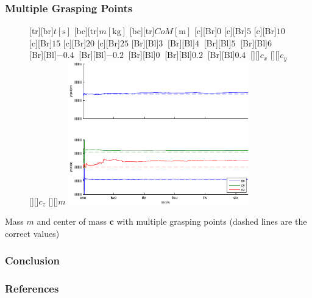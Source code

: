 \documentclass[student,noshadow]{ITRslides}
\renewcommand{\vec}[1]{\boldsymbol{#1}}
\renewcommand{\vec}[1]{\boldsymbol{#1}}
\begin{document}
\begin{frame}
	\frametitle{Multiple Grasping Points}
	\begin{center}
		\begin{figure}
			\centering	
			[tr][br]{$t\left[\mathrm{s}\right]$}
			[bc][tr]{$m\left[\mathrm{kg}\right]$}
			[bc][tr]{$CoM\left[\mathrm{m}\right]$}
			[c][Br]{$0$}
			[c][Br]{$5$}
			[c][Br]{$10$}
			[c][Br]{$15$}
			[c][Br]{$20$}
			[c][Br]{$25$}
			[Br][Bl]{$3\  $}
			[Br][Bl]{$4\ $}
			[Br][Bl]{$5\  $}
			[Br][Bl]{$6\  $}
			[Br][Bl]{$-0.4\  $}
			[Br][Bl]{$-0.2\ $}
			[Br][Bl]{$0\  $}
			[Br][Bl]{$0.2\  $}
			[Br][Bl]{$0.4\  $}
			[][]{\tiny $c_x$}
			[][]{\tiny $c_y$}
			[][]{\tiny $c_z$}
			[][]{\tiny $m$}
			\includegraphics[width=0.7\textwidth]{fig/multiple_grasping_points_human_mass_and_cog.eps}
		\end{figure}
		\vspace{0.2cm}
		Mass $m$ and center of mass $\vec{c}$ with multiple grasping points (dashed lines are the correct values)
	\end{center}
\end{frame}

\begin{frame}
	\frametitle{Conclusion}
\end{frame}

\appendix
\begin{frame}
	\frametitle{References}
	\printbibliography
\end{frame}
\end{document}
